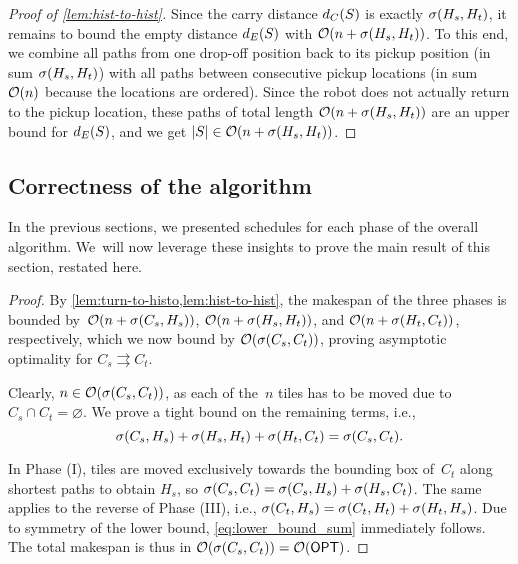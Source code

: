 \begin{proof}[Proof of \cref{lem:hist-to-hist}]
    Since the carry distance $d_C(S)$ is exactly $\sigma(H_s,H_t)$, it remains to bound the empty distance $d_E(S)$ with $\mathcal{O}(n + \sigma(H_s,H_t))$.
    To this end, we combine all paths from one drop-off position back to its pickup position (in sum $\sigma(H_s,H_t)$) with all paths between consecutive pickup locations (in sum $\mathcal{O}(n)$ because the locations are ordered).
    Since the robot does not actually return to the pickup location, these paths of total length $\mathcal{O}(n + \sigma(H_s,H_t))$ are an upper bound for $d_E(S)$, and we get $|S| \in \mathcal{O}(n + \sigma(H_s,H_t))$.
\end{proof}

\subsection{Correctness of the algorithm}
\label{sec:makespan}
In the previous sections, we presented schedules for each phase of the overall algorithm.
We~will now leverage these insights to prove the main result of this section, restated here.

\thmReconfigTwoScaled*
\begin{proof}
    By \cref{lem:turn-to-histo,lem:hist-to-hist}, the makespan of the three phases is bounded by~$\mathcal{O}(n + \sigma(C_s,H_s))$, $\mathcal{O}(n + \sigma(H_s,H_t))$, and $\mathcal{O}(n + \sigma(H_t,C_t))$, respectively, which we now bound by $\mathcal{O}(\sigma(C_s,C_t))$, proving asymptotic optimality for $C_s \rightrightarrows C_t$.

    Clearly, $n \in \mathcal{O}(\sigma(C_s,C_t))$, as each of the~$n$ tiles has to be moved due to $C_s\cap C_t=\varnothing$.
    We prove a tight bound on the remaining terms, i.e.,
    \begin{equation}
        \label{eq:lower_bound_sum}
        \sigma(C_s,H_s) + \sigma(H_s,H_t) + \sigma(H_t,C_t) = \sigma(C_s,C_t).
    \end{equation}

    In Phase (I), tiles are moved exclusively towards the bounding box of~$C_t$ along shortest paths to obtain $H_s$, so $\sigma(C_s,C_t) = \sigma(C_s,H_s) + \sigma(H_s,C_t)$.
    The same applies to the reverse of Phase (III), i.e., $\sigma(C_t,H_s) = \sigma(C_t,H_t) + \sigma(H_t,H_s)$.
    Due to symmetry of the lower bound, \cref{eq:lower_bound_sum} immediately follows.
    The total makespan is thus in $\mathcal{O}(\sigma(C_s,C_t))=\mathcal{O}(\textsf{OPT})$.
\end{proof}

